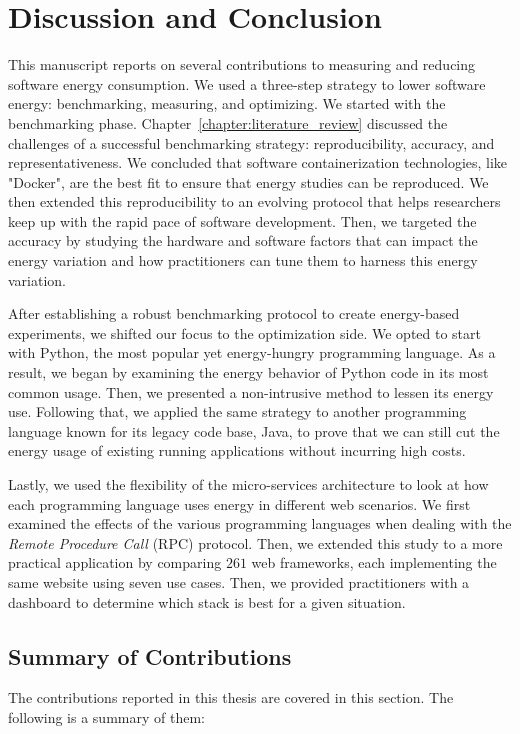 \clearpage
\chapter{Discussion and Conclusion}
\label{chapter:conclusion}

This manuscript reports on several contributions to measuring and reducing software energy consumption.
We used a three-step strategy to lower software energy: benchmarking, measuring, and optimizing.
We started with the benchmarking phase.
Chapter~\ref{chapter:literature_review} discussed the challenges of a successful benchmarking strategy: reproducibility, accuracy, and representativeness.
We concluded that software containerization technologies, like "Docker", are the best fit to ensure that energy studies can be reproduced.
We then extended this reproducibility to an evolving protocol that helps researchers keep up with the rapid pace of software development.
Then, we targeted the accuracy by studying the hardware and software factors that can impact the energy variation and how practitioners can tune them to harness this energy variation.

After establishing a robust benchmarking protocol to create energy-based experiments, we shifted our focus to the optimization side.
We opted to start with Python, the most popular yet energy-hungry programming language.
As a result, we began by examining the energy behavior of Python code in its most common usage.
Then, we presented a non-intrusive method to lessen its energy use.
Following that, we applied the same strategy to another programming language known for its legacy code base, Java, to prove that we can still cut the energy usage of existing running applications without incurring high costs.

Lastly, we used the flexibility of the micro-services architecture to look at how each programming language uses energy in different web scenarios.
We first examined the effects of the various programming languages when dealing with the \emph{Remote Procedure Call} (RPC) protocol.
Then, we extended this study to a more practical application by comparing $261$ web frameworks, each implementing the same website using seven use cases.
Then, we provided practitioners with a dashboard to determine which stack is best for a given situation.


\section{Summary of Contributions}
\label{section:SummaryofContributions}
The contributions reported in this thesis are covered in this section.
The following is a summary of them:

